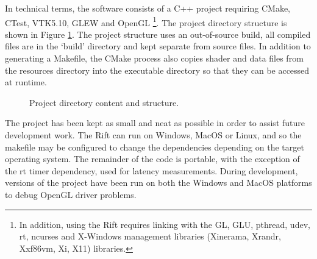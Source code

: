 \documentclass[MSc,paper=a4,pagesize=auto]{icldt}
\begin{document}
In technical terms, the software consists of a C++ project requiring CMake, CTest, VTK5.10, GLEW and OpenGL \footnote{In addition, using the Rift requires linking with the GL, GLU, pthread, udev, rt, ncurses and X-Windows management libraries (Xinerama, Xrandr, Xxf86vm, Xi, X11) libraries.}. The project directory structure is shown in Figure \ref{fig:project_directory_structure}. The project structure uses an out-of-source build, all compiled files are in the `build' directory and kept separate from source files. In addition to generating a Makefile, the CMake process also copies shader and data files from the resources directory into the executable directory so that they can be accessed at runtime.

\begin{figure}
\centering
{}
\caption{Project directory content and structure.}
\label{fig:project_directory_structure}
\end{figure}

The project has been kept as small and neat as possible in order to assist future development work. The Rift can run on Windows, MacOS or Linux, and so the makefile may be configured to change the dependencies depending on the target operating system. The remainder of the code is portable, with the exception of the rt timer dependency, used for latency measurements. During development, versions of the project have been run on both the Windows and MacOS platforms to debug OpenGL driver problems.
\end{document}

